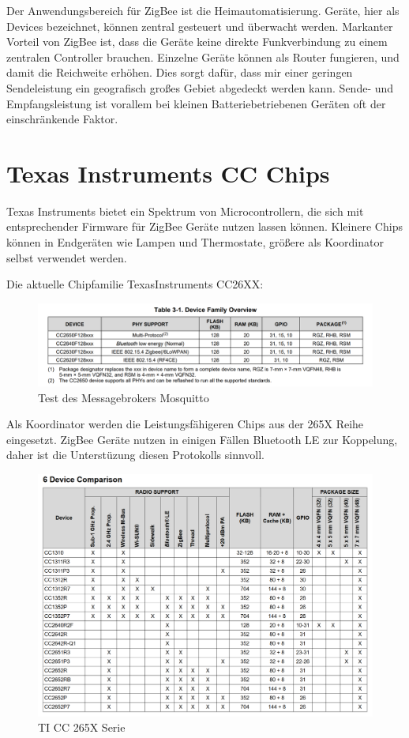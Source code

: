 Der Anwendungsbereich für ZigBee ist die Heimautomatisierung. Geräte, hier als Devices bezeichnet, können zentral gesteuert und überwacht werden. 
Markanter Vorteil von ZigBee ist, dass die Geräte keine direkte Funkverbindung
zu einem zentralen Controller brauchen. Einzelne Geräte können als Router fungieren, und damit die Reichweite erhöhen. Dies sorgt dafür,
dass mir einer geringen Sendeleistung ein geografisch großes Gebiet abgedeckt werden kann. Sende- und Empfangsleistung
ist vorallem bei kleinen Batteriebetriebenen Geräten oft der einschränkende Faktor.


\section{Texas Instruments CC Chips}

Texas Instruments bietet ein Spektrum von Microcontrollern, die sich mit entsprechender Firmware für ZigBee Geräte 
nutzen lassen können. Kleinere Chips können in Endgeräten wie Lampen und Thermostate, größere als Koordinator selbst verwendet werden.

Die aktuelle Chipfamilie TexasInstruments CC26XX:

\begin{figure}[H]
  \centering
  \includegraphics[width=1\textwidth]{media/table26xx.png}
  \caption{Test des Messagebrokers Mosquitto}
\end{figure}

Als Koordinator werden die Leistungsfähigeren Chips aus der 265X Reihe eingesetzt. ZigBee Geräte nutzen in einigen
Fällen Bluetooth LE zur Koppelung, daher ist die Unterstüzung diesen Protokolls sinnvoll.

\begin{figure}[H]
  \centering
  \includegraphics[width=1\textwidth]{media/table265x.png}
  \caption{TI CC 265X Serie}
\end{figure}

